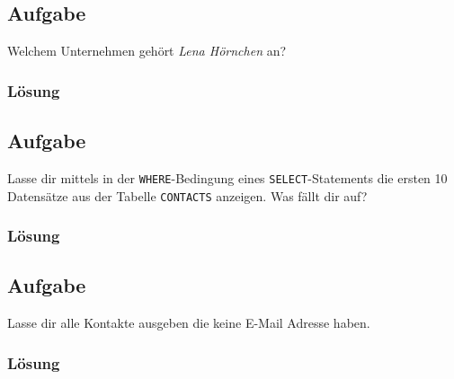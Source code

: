 \subsection{Aufgabe}
\label{sec:uebung_01.aufgabe_08}
Welchem Unternehmen gehört \textit{Lena Hörnchen} an?

\subsubsection*{Lösung}
\label{sec:uebung_01.aufgabe_08.loesung}

\subsection{Aufgabe}
\label{sec:uebung_01.aufgabe_09}
Lasse dir mittels  in der \texttt{WHERE}-Bedingung eines \texttt{SELECT}-Statements die ersten 10 Datensätze aus der Tabelle \texttt{CONTACTS} anzeigen. Was fällt dir auf?

\subsubsection*{Lösung}
\label{sec:uebung_01.aufgabe_09.loesung}

\subsection{Aufgabe}
\label{sec:uebung_01.aufgabe_10}
Lasse dir alle Kontakte ausgeben die keine E-Mail Adresse haben.

\subsubsection*{Lösung}
\label{sec:uebung_01.aufgabe_10.loesung}
